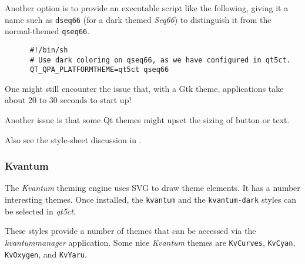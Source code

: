    Another option is to provide an executable script like the following,
   giving it a name such as \texttt{dseq66}
   (for a dark themed \textsl{Seq66}) to
   distinguish it from the normal-themed \texttt{qseq66}.

   \begin{verbatim}
      #!/bin/sh
      # Use dark coloring on qseq66, as we have configured in qt5ct.
      QT_QPA_PLATFORMTHEME=qt5ct qseq66
   \end{verbatim}

   One might still encounter the issue that, with a Gtk theme, applications
   take about 20 to 30 seconds to start up!

   Another issue is that some Qt themes might upset the sizing of button or
   text.

   Also see the style-sheet discussion in
   .

\subsubsection{Kvantum}
\label{subsubsec:palettes_theming_kvantum}

   The \textsl{Kvantum} theming engine uses SVG to draw theme elements.
   It has a number interesting themes. Once installed,
   the \texttt{kvantum} and
   the \texttt{kvantum-dark}
   styles can be selected in \textsl{qt5ct}.

   These styles provide a number of themes that can be
   accessed via the \textsl{kvantummanager} application.
   Some nice \textsl{Kvantum} themes are \texttt{KvCurves},
   \texttt{KvCyan},
   \texttt{KvOxygen}, and
   \texttt{KvYaru}.

